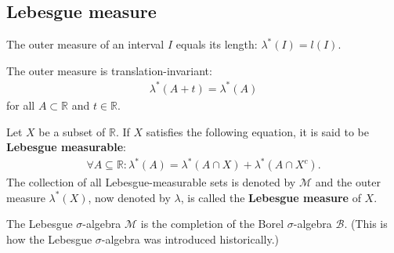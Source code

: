 \subsection{Lebesgue measure}


    \begin{property}[Intervals]
        The outer measure of an interval $I$ equals its length: $\lambda^*(I) = l(I)$.
    \end{property}
    \begin{property}\label{lebesgue:translation_invariant}
        The outer measure is translation-invariant:
        \begin{gather}
            \lambda^*(A+t) = \lambda^*(A)
        \end{gather}
        for all $A\subset\mathbb{R}$ and $t\in\mathbb{R}$.
    \end{property}

    \begin{theorem}\label{lebesgue:lebesgue_measure}
        Let $X$ be a subset of $\mathbb{R}$. If $X$ satisfies the following equation, it is said to be \textbf{Lebesgue measurable}:
        \begin{gather}
            \forall A\subseteq\mathbb{R}:\lambda^*(A) = \lambda^*(A\cap X) + \lambda^*(A\cap X^c).
        \end{gather}
        The collection of all Lebesgue-measurable sets is denoted by $\mathcal{M}$ and the outer measure $\lambda^*(X)$, now denoted by $\lambda$, is called the \textbf{Lebesgue measure} of $X$.
    \end{theorem}
    \begin{result}\label{lebesgue:completion_remark}
        The Lebesgue $\sigma$-algebra $\mathcal{M}$ is the completion of the Borel $\sigma$-algebra $\mathcal{B}$. (This is how the Lebesgue $\sigma$-algebra was introduced historically.)
    \end{result}

